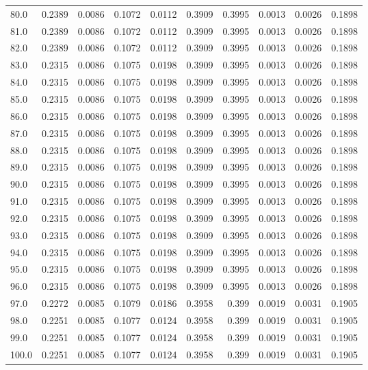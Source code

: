 \begin{longtable}{lrrrrrrrrr}
80.0 & 0.2389 & 0.0086 & 0.1072 & 0.0112 & 0.3909 & 0.3995 & 0.0013 & 0.0026 & 0.1898 \\
81.0 & 0.2389 & 0.0086 & 0.1072 & 0.0112 & 0.3909 & 0.3995 & 0.0013 & 0.0026 & 0.1898 \\
82.0 & 0.2389 & 0.0086 & 0.1072 & 0.0112 & 0.3909 & 0.3995 & 0.0013 & 0.0026 & 0.1898 \\
83.0 & 0.2315 & 0.0086 & 0.1075 & 0.0198 & 0.3909 & 0.3995 & 0.0013 & 0.0026 & 0.1898 \\
84.0 & 0.2315 & 0.0086 & 0.1075 & 0.0198 & 0.3909 & 0.3995 & 0.0013 & 0.0026 & 0.1898 \\
85.0 & 0.2315 & 0.0086 & 0.1075 & 0.0198 & 0.3909 & 0.3995 & 0.0013 & 0.0026 & 0.1898 \\
86.0 & 0.2315 & 0.0086 & 0.1075 & 0.0198 & 0.3909 & 0.3995 & 0.0013 & 0.0026 & 0.1898 \\
87.0 & 0.2315 & 0.0086 & 0.1075 & 0.0198 & 0.3909 & 0.3995 & 0.0013 & 0.0026 & 0.1898 \\
88.0 & 0.2315 & 0.0086 & 0.1075 & 0.0198 & 0.3909 & 0.3995 & 0.0013 & 0.0026 & 0.1898 \\
89.0 & 0.2315 & 0.0086 & 0.1075 & 0.0198 & 0.3909 & 0.3995 & 0.0013 & 0.0026 & 0.1898 \\
90.0 & 0.2315 & 0.0086 & 0.1075 & 0.0198 & 0.3909 & 0.3995 & 0.0013 & 0.0026 & 0.1898 \\
91.0 & 0.2315 & 0.0086 & 0.1075 & 0.0198 & 0.3909 & 0.3995 & 0.0013 & 0.0026 & 0.1898 \\
92.0 & 0.2315 & 0.0086 & 0.1075 & 0.0198 & 0.3909 & 0.3995 & 0.0013 & 0.0026 & 0.1898 \\
93.0 & 0.2315 & 0.0086 & 0.1075 & 0.0198 & 0.3909 & 0.3995 & 0.0013 & 0.0026 & 0.1898 \\
94.0 & 0.2315 & 0.0086 & 0.1075 & 0.0198 & 0.3909 & 0.3995 & 0.0013 & 0.0026 & 0.1898 \\
95.0 & 0.2315 & 0.0086 & 0.1075 & 0.0198 & 0.3909 & 0.3995 & 0.0013 & 0.0026 & 0.1898 \\
96.0 & 0.2315 & 0.0086 & 0.1075 & 0.0198 & 0.3909 & 0.3995 & 0.0013 & 0.0026 & 0.1898 \\
97.0 & 0.2272 & 0.0085 & 0.1079 & 0.0186 & 0.3958 & 0.399 & 0.0019 & 0.0031 & 0.1905 \\
98.0 & 0.2251 & 0.0085 & 0.1077 & 0.0124 & 0.3958 & 0.399 & 0.0019 & 0.0031 & 0.1905 \\
99.0 & 0.2251 & 0.0085 & 0.1077 & 0.0124 & 0.3958 & 0.399 & 0.0019 & 0.0031 & 0.1905 \\
100.0 & 0.2251 & 0.0085 & 0.1077 & 0.0124 & 0.3958 & 0.399 & 0.0019 & 0.0031 & 0.1905 \\

\end{longtable}
